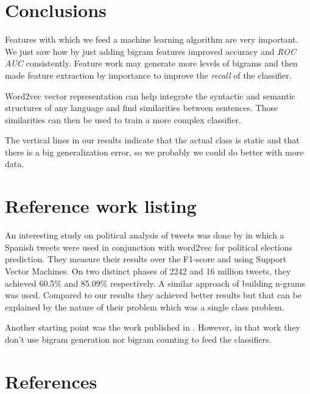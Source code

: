 \documentclass[author-year, review]{elsarticle} %
\let\parencite\cite
\begin{document}
\section{Conclusions}\label{conclusions}

Features with which we feed a machine learning algorithm are very
important. We just saw how by just adding bigram features improved
accuracy and \emph{ROC AUC} consistently. Feature work may generate more
levels of bigrams and then made feature extraction by importance to
improve the \emph{recall} of the classifier.

Word2vec vector representation can help integrate the syntactic and
semantic structures of any language and find similarities between
sentences. Those similarities can then be used to train a more complex
classifier.

The vertical lines in our results indicate that the actual class is
static and that there is a big generalization error, so we probably we
could do better with more data.

\section{Reference work listing}\label{reference-work-listing}

An interesting study on political analysis of tweets was done by
\parencite{2017a}
in which a Spanish tweets were used in conjunction with word2vec for
political elections prediction. They measure their results over the
F1-score and using Support Vector Machines. On two distinct phases of
2242 and 16 million tweets, they achieved 60.5\% and 85.09\%
respectively. A similar approach of building n-grams was used. Compared
to our results they achieved better results but that can be explained by
the nature of their problem which was a single class problem.

Another starting point was the work published in
\parencite{2017b}.
However, in that work they don't use bigram generation nor bigram
counting to feed the classifiers.

\section{References}\label{references}






\end{document}
